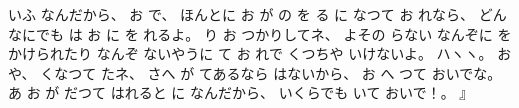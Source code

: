 いふ
なんだから、
%
お
で、
%
ほんとに
お
が
の
を
る
に
なつて
お
れなら、
%
どんなにでも
は
お
に
を
れるよ。
%
%
り
お
つかりしてネ、
%
よその
らない
なんぞに
を
かけられたり
なんぞ
ないやうに
て
お
れで
くつちや
いけないよ。
%
ハヽヽ。
%
おや、
%
くなつて
たネ、
%
さへ
が
てあるなら
はないから、
%
お
へ
つて
おいでな。
%
あ
お
が
だつて
はれると
に
なんだから、
%
いくらでも
いて
おいで！。
』
